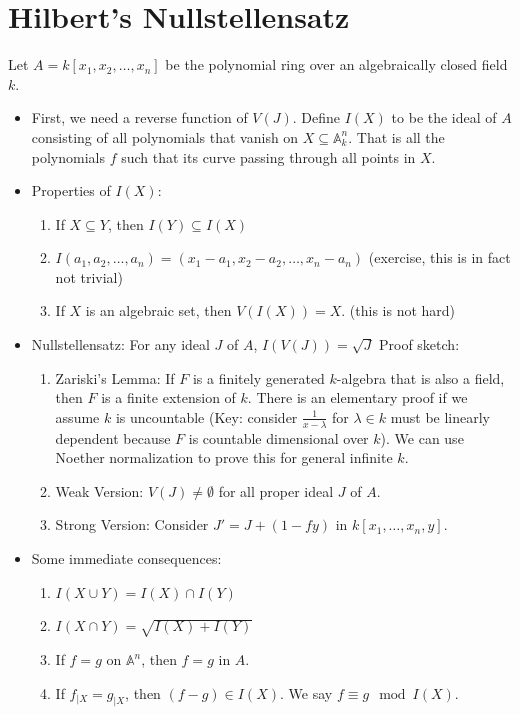\documentclass[15pt]{scrartcl}
\newcommand{\A}{\mathbb{A}}
\begin{document}
\section{Hilbert's Nullstellensatz}
Let $A=k[x_1,x_2,\ldots,x_n]$ be the polynomial ring over an algebraically closed field $k$.
\begin{itemize}
    \item First, we need a reverse function of $V(J)$. Define $I(X)$ to be the ideal of $A$ consisting of all polynomials that vanish on $X\subseteq \A^n_k$. That is all the polynomials $f$ such that its curve passing through all points in $X$.
    \item Properties of $I(X)$:
    \begin{enumerate}
        \item If $X\subseteq Y$, then $I(Y)\subseteq I(X)$
        \item $I({a_1,a_2,\ldots,a_n})=(x_1-a_1,x_2-a_2,\ldots,x_n-a_n)$ (exercise, this is in fact not trivial)
        \item If $X$ is an algebraic set, then $V(I(X))=X$. (this is not hard)
    \end{enumerate}
    \item Nullstellensatz: For any ideal $J$ of $A$, $I(V(J))=\sqrt{J}$
    Proof sketch:
    \begin{enumerate}
    \item Zariski's Lemma: If $F$ is a finitely generated $k$-algebra that is also a field, then $F$ is a finite extension of $k$. There is an elementary proof if we assume $k$ is uncountable (Key: consider $\frac{1}{x-\lambda}$ for $\lambda\in k$ must be linearly dependent because $F$ is countable dimensional over $k$). We can use Noether normalization to prove this for general infinite $k$.
    \item Weak Version: $V(J)\neq \emptyset $ for all proper ideal $J$ of $A$. 
    \item Strong Version: Consider $J'=J+(1-fy)$ in $k[x_1,\ldots,x_n,y]$. 
    \end{enumerate}
    \item Some immediate consequences:
    \begin{enumerate}
        \item $I(X\cup Y)=I(X)\cap I(Y)$
        \item $I(X\cap Y)=\sqrt{I(X)+I(Y)}$
        \item If $f=g$ on $\A^n$, then $f=g$ in $A$.
        \item If $f_{\mid X}=g_{\mid X}$, then $(f-g)\in I(X)$. We say $f\equiv g \mod I(X)$.
    \end{enumerate}
\end{itemize}
\newpage 
\end{document}
